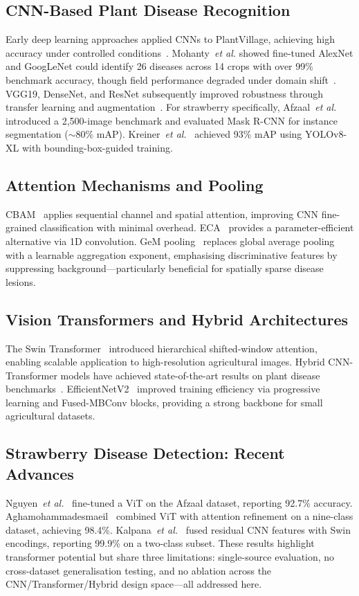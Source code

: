 \documentclass[conference]{IEEEtran}
\begin{document}
\subsection{CNN-Based Plant Disease Recognition}
Early deep learning approaches applied CNNs to PlantVillage, achieving high accuracy under controlled conditions~\cite{b3}. Mohanty~\textit{et al.} showed fine-tuned AlexNet and GoogLeNet could identify 26 diseases across 14 crops with over 99\% benchmark accuracy, though field performance degraded under domain shift~\cite{b3}. VGG19, DenseNet, and ResNet subsequently improved robustness through transfer learning and augmentation~\cite{b7}. For strawberry specifically, Afzaal~\textit{et al.}~\cite{b6} introduced a 2,500-image benchmark and evaluated Mask R-CNN for instance segmentation (${\sim}80\%$ mAP). Kreiner~\textit{et al.}~\cite{b8} achieved 93\% mAP using YOLOv8-XL with bounding-box-guided training.

\subsection{Attention Mechanisms and Pooling}
CBAM~\cite{b9} applies sequential channel and spatial attention, improving CNN fine-grained classification with minimal overhead. ECA~\cite{b10} provides a parameter-efficient alternative via 1D convolution. GeM pooling~\cite{b11} replaces global average pooling with a learnable aggregation exponent, emphasising discriminative features by suppressing background---particularly beneficial for spatially sparse disease lesions.

\subsection{Vision Transformers and Hybrid Architectures}
The Swin Transformer~\cite{b4} introduced hierarchical shifted-window attention, enabling scalable application to high-resolution agricultural images. Hybrid CNN-Transformer models have achieved state-of-the-art results on plant disease benchmarks~\cite{b5}. EfficientNetV2~\cite{b18} improved training efficiency via progressive learning and Fused-MBConv blocks, providing a strong backbone for small agricultural datasets.

\subsection{Strawberry Disease Detection: Recent Advances}
Nguyen~\textit{et al.}~\cite{b13} fine-tuned a ViT on the Afzaal dataset, reporting 92.7\% accuracy. Aghamohammadesmaeil~\cite{b14} combined ViT with attention refinement on a nine-class dataset, achieving 98.4\%. Kalpana~\textit{et al.}~\cite{b15} fused residual CNN features with Swin encodings, reporting 99.9\% on a two-class subset. These results highlight transformer potential but share three limitations: single-source evaluation, no cross-dataset generalisation testing, and no ablation across the CNN/Transformer/Hybrid design space---all addressed here.
\end{document}
